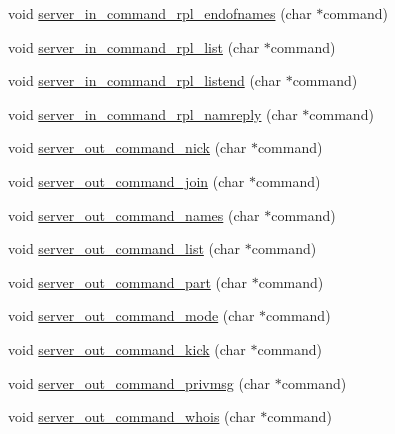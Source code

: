 \begin{DoxyCompactItemize}
\item 
void \hyperlink{G-2313-06-P2__client__function__handlers_8c_a11fdd753a098bb69dc7ca93a89433abb}{server\+\_\+in\+\_\+command\+\_\+rpl\+\_\+endofnames} (char $\ast$command)
\item 
void \hyperlink{G-2313-06-P2__client__function__handlers_8c_a032cc47903f14a4fbdcec9e54f6a8e4a}{server\+\_\+in\+\_\+command\+\_\+rpl\+\_\+list} (char $\ast$command)
\item 
void \hyperlink{G-2313-06-P2__client__function__handlers_8c_ad4a1e3d492ae6907a5e15e92cb9b69f7}{server\+\_\+in\+\_\+command\+\_\+rpl\+\_\+listend} (char $\ast$command)
\item 
void \hyperlink{G-2313-06-P2__client__function__handlers_8c_a770ed57ba6c48c4a349208439e3f19ef}{server\+\_\+in\+\_\+command\+\_\+rpl\+\_\+namreply} (char $\ast$command)
\item 
void \hyperlink{G-2313-06-P2__client__function__handlers_8c_a43f3e63fcf23bd087e02911f79b789b0}{server\+\_\+out\+\_\+command\+\_\+nick} (char $\ast$command)
\item 
void \hyperlink{G-2313-06-P2__client__function__handlers_8c_a49e60d29aef3725ab2a91c7f99e61021}{server\+\_\+out\+\_\+command\+\_\+join} (char $\ast$command)
\item 
void \hyperlink{G-2313-06-P2__client__function__handlers_8c_ab2f3bd779063c27074a6cdce0f98ee0a}{server\+\_\+out\+\_\+command\+\_\+names} (char $\ast$command)
\item 
void \hyperlink{G-2313-06-P2__client__function__handlers_8c_a0a66dad6908cd303ae31f06dda298e5f}{server\+\_\+out\+\_\+command\+\_\+list} (char $\ast$command)
\item 
void \hyperlink{G-2313-06-P2__client__function__handlers_8c_a39f81214b8394e2b7fb0989e5fe10fb3}{server\+\_\+out\+\_\+command\+\_\+part} (char $\ast$command)
\item 
void \hyperlink{G-2313-06-P2__client__function__handlers_8c_afa583197101ff2eb07ab93ccd10da962}{server\+\_\+out\+\_\+command\+\_\+mode} (char $\ast$command)
\item 
void \hyperlink{G-2313-06-P2__client__function__handlers_8c_a4e94d9864089e10109fc24ce92d4368b}{server\+\_\+out\+\_\+command\+\_\+kick} (char $\ast$command)
\item 
void \hyperlink{G-2313-06-P2__client__function__handlers_8c_a4c442d20949a3a3e84551a5f23ce8263}{server\+\_\+out\+\_\+command\+\_\+privmsg} (char $\ast$command)
\item 
void \hyperlink{G-2313-06-P2__client__function__handlers_8c_af34c02fb3b13802e2c457a302c66cb89}{server\+\_\+out\+\_\+command\+\_\+whois} (char $\ast$command)

\end{DoxyCompactItemize}

